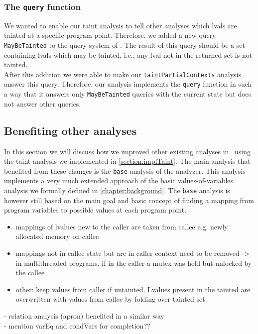     \subsubsection{The \texttt{query} function}
      We wanted to enable our taint analysis to tell other analyses which \ac{lval}s are tainted at a specific program point. Therefore, we added a new query \texttt{MayBeTainted} to the query system of \gob. The result of this query should be a set containing \ac{lval}s which may be tainted, i.e., any \ac{lval} not in the returned set is not tainted.\\
      After this addition we were able to make our \texttt{taintPartialContexts} analysis answer this query. Therefore, our analysis implements the \texttt{query} function in such a way that it answers only \texttt{MayBeTainted} queries with the current state but does not answer other queries.

    \subsection{Benefiting other analyses}
    In this section we will discuss how we improved other existing analyses in \gob\ using the taint analysis we implemented in \autoref{section:implTaint}. The main analysis that benefited from these changes is the \texttt{base} analysis of the analyzer. This analysis implements a very much extended approach of the basic values-of-variables analysis we formally defined in \autoref{chapter:background}. The \texttt{base} analysis is however still based on the main goal and basic concept of finding a mapping from program variables to possible values at each program point.


    \begin{itemize}
      \item mappings of lvalues new to the caller are taken from callee e.g. newly allocated memory on callee
      \item mappings not in callee state but are in caller context need to be removed -> in multithreaded programs, if in the caller a mutex was held but unlocked by the callee
      \item other: keep values from caller if untainted. Lvalues present in the tainted are overwritten with values from callee by folding over tainted set.
    \end{itemize}
    - relation analysis (apron) benefited in a similar way\\
    - mention varEq and condVars for completion??\\

